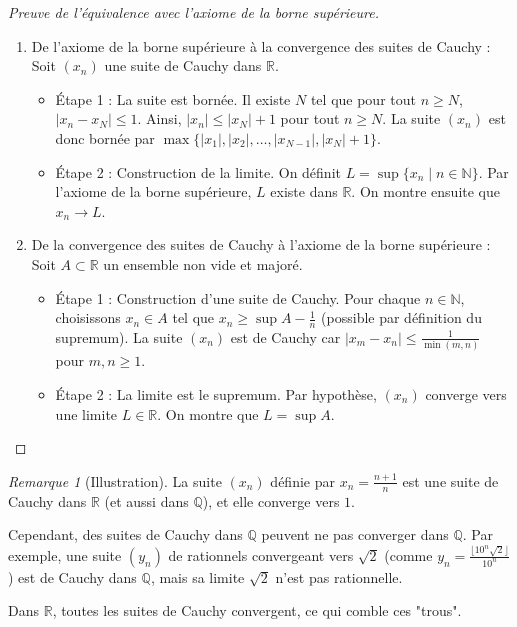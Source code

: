 \documentclass{report} %
\theoremstyle{definition}  %
\theoremstyle{plain} %
\theoremstyle{remark} %
\newtheorem*{remark}{Remarque} %
\begin{document}
\begin{proof}[Preuve de l'équivalence avec l'axiome de la borne supérieure]
\leavevmode
\begin{enumerate}
    \item De l’axiome de la borne supérieure à la convergence des suites de Cauchy :
    Soit \((x_n)\) une suite de Cauchy dans \(\mathbb{R}\).
    \begin{itemize}
        \item Étape 1 : La suite est bornée.
        Il existe \(N\) tel que pour tout \(n \geq N\), \(|x_n - x_N| \leq 1\).
        Ainsi, \(|x_n| \leq |x_N| + 1\) pour tout \(n \geq N\).
        La suite \((x_n)\) est donc bornée par \(\max\{|x_1|, |x_2|, \dots, |x_{N-1}|, |x_N| + 1\}\).

        \item Étape 2 : Construction de la limite.
        On définit \(L = \sup\{x_n \mid n \in \mathbb{N}\}\).
        Par l’axiome de la borne supérieure, \(L\) existe dans \(\mathbb{R}\).
        On montre ensuite que \(x_n \to L\).
    \end{itemize}

    \item De la convergence des suites de Cauchy à l’axiome de la borne supérieure :
    Soit \(A \subset \mathbb{R}\) un ensemble non vide et majoré.
    \begin{itemize}
        \item Étape 1 : Construction d’une suite de Cauchy.
        Pour chaque \(n \in \mathbb{N}\), choisissons \(x_n \in A\) tel que \(x_n \geq \sup A - \frac{1}{n}\) (possible par définition du supremum).
        La suite \((x_n)\) est de Cauchy car \(|x_m - x_n| \leq \frac{1}{\min(m,n)}\) pour \(m, n \geq 1\).

        \item Étape 2 : La limite est le supremum.
        Par hypothèse, \((x_n)\) converge vers une limite \(L \in \mathbb{R}\).
        On montre que \(L = \sup A\).
    \end{itemize}
\end{enumerate}
\end{proof}

\medskip

\begin{remark}[Illustration]
La suite \((x_n)\) définie par \(x_n = \frac{n+1}{n}\) est une suite de Cauchy dans \(\mathbb{R}\) (et aussi dans \(\mathbb{Q}\)), et elle converge vers \(1\).
\medskip

\noindent
Cependant, des suites de Cauchy dans \(\mathbb{Q}\) peuvent ne pas converger dans \(\mathbb{Q}\).
Par exemple, une suite \((y_n)\) de rationnels convergeant vers \(\sqrt{2}\) (comme \(y_n = \frac{\lfloor 10^n \sqrt{2} \rfloor}{10^n}\)) est de Cauchy dans \(\mathbb{Q}\), mais sa limite \(\sqrt{2}\) n’est pas rationnelle.
\medskip

\noindent
Dans \(\mathbb{R}\), toutes les suites de Cauchy convergent, ce qui comble ces "trous".
\end{remark}
\end{document}
